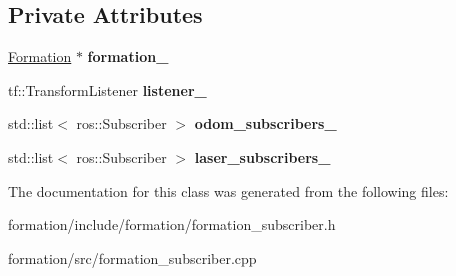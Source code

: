 \subsection*{Private Attributes}
\begin{DoxyCompactItemize}
\item 
\hyperlink{classFormation}{Formation} $\ast$ {\bfseries formation\+\_\+}\hypertarget{classFormationSubscriber_a5c3e1951c929d9f8e069a6a3dfe617f7}{}\label{classFormationSubscriber_a5c3e1951c929d9f8e069a6a3dfe617f7}

\item 
tf\+::\+Transform\+Listener {\bfseries listener\+\_\+}\hypertarget{classFormationSubscriber_a73b853f947df83fd15788ee09729f5f2}{}\label{classFormationSubscriber_a73b853f947df83fd15788ee09729f5f2}

\item 
std\+::list$<$ ros\+::\+Subscriber $>$ {\bfseries odom\+\_\+subscribers\+\_\+}\hypertarget{classFormationSubscriber_ad9f976b3e787695511b231126b5690a9}{}\label{classFormationSubscriber_ad9f976b3e787695511b231126b5690a9}

\item 
std\+::list$<$ ros\+::\+Subscriber $>$ {\bfseries laser\+\_\+subscribers\+\_\+}\hypertarget{classFormationSubscriber_a07c4f6a377d998cf14fb152c155e0798}{}\label{classFormationSubscriber_a07c4f6a377d998cf14fb152c155e0798}

\end{DoxyCompactItemize}


The documentation for this class was generated from the following files\+:\begin{DoxyCompactItemize}
\item 
formation/include/formation/formation\+\_\+subscriber.\+h\item 
formation/src/formation\+\_\+subscriber.\+cpp\end{DoxyCompactItemize}
